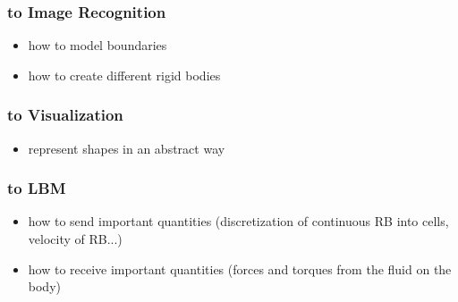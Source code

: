 \subsubsection{to Image Recognition}
\begin{itemize}
\item how to model boundaries
\item how to create different rigid bodies
\end{itemize}
\subsubsection{to Visualization}
\begin{itemize}
\item represent shapes in an abstract way
\end{itemize}
\subsubsection{to LBM}
\begin{itemize}
\item how to send important quantities (discretization of continuous RB into cells, velocity of RB...)
\item how to receive important quantities (forces and torques from the fluid on the body)
\end{itemize}